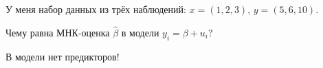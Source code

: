 
\begin{question}
У меня набор данных из трёх наблюдений: \(x = (1, 2, 3)\), \(y = (5, 6, 10)\).

Чему равна МНК-оценка \(\hat\beta\) в модели \(y_i = \beta + u_i\)?
\end{question}

\begin{solution}
В модели нет предикторов!
\end{solution}

